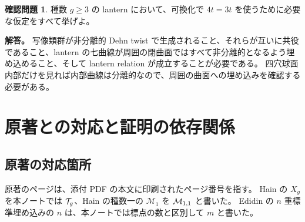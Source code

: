 \documentclass[dvipdfmx,a4paper,11pt]{article}
\theoremstyle{definition}
\newtheorem{ques}{確認問題}[section]
\begin{document}
\begin{ques}
種数 $g\ge3$ の lantern において、可換化で $4t=3t$ を使うために必要な仮定をすべて挙げよ。
\end{ques}
\textbf{解答。}
写像類群が非分離的 Dehn twist で生成されること、それらが互いに共役であること、lantern の七曲線が周囲の閉曲面ではすべて非分離的となるよう埋め込めること、そして lantern relation が成立することが必要である。
四穴球面内部だけを見れば内部曲線は分離的なので、周囲の曲面への埋め込みを確認する必要がある。

\clearpage
\section{原著との対応と証明の依存関係}\label{app:map}
\subsection{原著の対応箇所}
原著のページは、添付 PDF の本文に印刷されたページ番号を指す。
Hain の $X_g$ を本ノートでは $\mathcal T_g$、Hain の種数一の $\mathcal M_1$ を $\mathcal M_{1,1}$ と書いた。
Edidin の $n$ 重標準埋め込みの $n$ は、本ノートでは標点の数と区別して $m$ と書いた。
\end{document}
